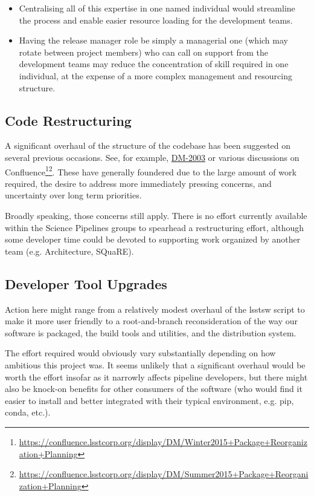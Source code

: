 \documentclass[DM,toc]{lsstdoc}
\begin{document}
\begin{itemize}

  \item{Centralising all of this expertise in one named individual would
  streamline the process and enable easier resource loading for the
  development teams.}

  \item{Having the release manager role be simply a managerial one (which may
  rotate between project members) who can call on support from the development
  teams may reduce the concentration of skill required in one individual, at
  the expense of a more complex management and resourcing structure.}

\end{itemize}

\subsection{Code Restructuring}
\label{sec:restructure}

A significant overhaul of the structure of the codebase has been suggested on
several previous occasions. See, for example,
\href{https://jira.lsstcorp.org/browse/DM-2003}{DM-2003} or various
discussions on
Confluence\footnote{\url{https://confluence.lsstcorp.org/display/DM/Winter2015+Package+Reorganization+Planning}}\footnote{\url{https://confluence.lsstcorp.org/display/DM/Summer2015+Package+Reorganization+Planning}}.
These have generally foundered due to the large amount of work required,
the desire to address more immediately pressing concerns, and uncertainty over
long term priorities.

Broadly speaking, those concerns still apply. There is no effort currently
available within the Science Pipelines groups to spearhead a restructuring
effort, although some developer time could be devoted to supporting work
organized by another team (e.g. Architecture, SQuaRE).

\subsection{Developer Tool Upgrades}
\label{sec:devtools}

Action here might range from a relatively modest overhaul of the lsstsw script
to make it more user friendly to a root-and-branch reconsideration of the way
our software is packaged, the build tools and utilities, and the distribution
system.

The effort required would obviously vary substantially depending on how
ambitious this project was. It seems unlikely that a significant overhaul
would be worth the effort insofar as it narrowly affects pipeline developers,
but there might also be knock-on benefits for other consumers of the software
(who would find it easier to install and better integrated with their typical
environment, e.g. pip, conda, etc.).
\end{document}
